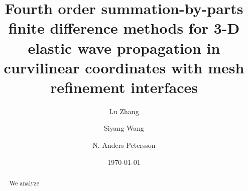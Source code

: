 \documentclass[11pt]{article}
\title{Fourth order summation-by-parts finite difference methods for  3-D elastic wave propagation in curvilinear coordinates with mesh refinement interfaces}
\date{\today}
\author{ Lu Zhang \and Siyang Wang \and N. Anders Petersson}
\begin{document}
\maketitle

\begin{abstract}
We analyze
\end{abstract}





%

%

%







%

%

%

%

%
























\end{document}
